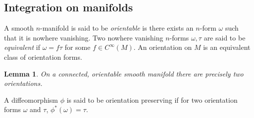 \documentclass{article}
\theoremstyle{plain}
\newtheorem{lem}[teo]{Lemma}
\theoremstyle{definition}
\begin{document}
\subsection{Integration on manifolds}
A smooth $n$-manifold is said to be \textit{orientable} is there exists an $n$-form $\omega$ such that it is nowhere vanishing. Two nowhere vanishing $n$-forms $\omega,\tau$ are said to be \textit{equivalent} if $\omega=f\tau$ for some $f\in C^\infty(M)$. An orientation on $M$ is an equivalent class of orientation forms.
\begin{lem}
On a connected, orientable smooth manifold there are precisely two orientations.
\end{lem}
A diffeomorphism $\phi$ is said to be orientation preserving if for two orientation forms $\omega$ and $\tau$, $\phi^*(\omega)=\tau$. 
\end{document}
